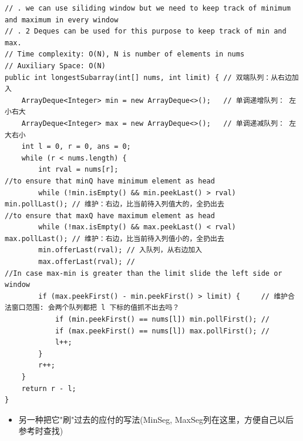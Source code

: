 \documentclass[9pt, b5paaper]{book}
\begin{document}
\begin{verbatim}
// . we can use siliding window but we need to keep track of minimum and maximum in every window 
// . 2 Deques can be used for this purpose to keep track of min and max.
// Time complexity: O(N), N is number of elements in nums
// Auxiliary Space: O(N)
public int longestSubarray(int[] nums, int limit) { // 双端队列：从右边加入
    ArrayDeque<Integer> min = new ArrayDeque<>();   // 单调递增队列： 左小右大
    ArrayDeque<Integer> max = new ArrayDeque<>();   // 单调递减队列： 左大右小
    int l = 0, r = 0, ans = 0;
    while (r < nums.length) {
        int rval = nums[r];
//to ensure that minQ have minimum element as head             
        while (!min.isEmpty() && min.peekLast() > rval) min.pollLast(); // 维护：右边，比当前待入列值大的，全扔出去
//to ensure that maxQ have maximum element as head                
        while (!max.isEmpty() && max.peekLast() < rval) max.pollLast(); // 维护：右边，比当前待入列值小的，全扔出去                
        min.offerLast(rval); // 入队列，从右边加入
        max.offerLast(rval); // 
//In case max-min is greater than the limit slide the left side or window         
        if (max.peekFirst() - min.peekFirst() > limit) {     // 维护合法窗口范围: 会两个队列都把 l 下标的值抓不出去吗？
            if (min.peekFirst() == nums[l]) min.pollFirst(); // 
            if (max.peekFirst() == nums[l]) max.pollFirst(); // 
            l++;
        }
        r++;
    }
    return r - l;
}
\end{verbatim}
\begin{itemize}
\item 另一种把它"刷"过去的应付的写法(MinSeg, MaxSeg列在这里，方便自己以后参考时查找)
\end{itemize}
\end{document}
